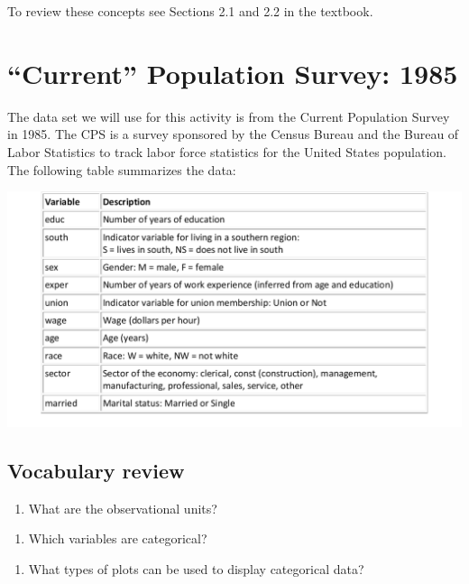 \documentclass[
]{report}
\providecommand{\tightlist}{%
  \setlength{\itemsep}{0pt}\setlength{\parskip}{0pt}}
\begin{document}
To review these concepts see Sections 2.1 and 2.2 in the textbook.

\newpage

\hypertarget{current-population-survey-1985}{%
\section{``Current'' Population Survey: 1985}\label{current-population-survey-1985}}

The data set we will use for this activity is from the Current Population Survey in 1985. The CPS is a survey sponsored by the Census Bureau and the Bureau of Labor Statistics to track labor force statistics for the United States population. The following table summarizes the data:

\begin{center}\includegraphics[width=0.7\linewidth]{images/cps} \end{center}

\hypertarget{vocabulary-review}{%
\subsection{Vocabulary review}\label{vocabulary-review}}

\begin{enumerate}
\def\labelenumi{\arabic{enumi}.}
\tightlist
\item
  What are the observational units?
\end{enumerate}

\vspace{0.2in}

\begin{enumerate}
\def\labelenumi{\arabic{enumi}.}
\setcounter{enumi}{1}
\tightlist
\item
  Which variables are categorical?
\end{enumerate}

\vspace{0.4in}

\begin{enumerate}
\def\labelenumi{\arabic{enumi}.}
\setcounter{enumi}{2}
\tightlist
\item
  What types of plots can be used to display categorical data?
\end{enumerate}
\end{document}
